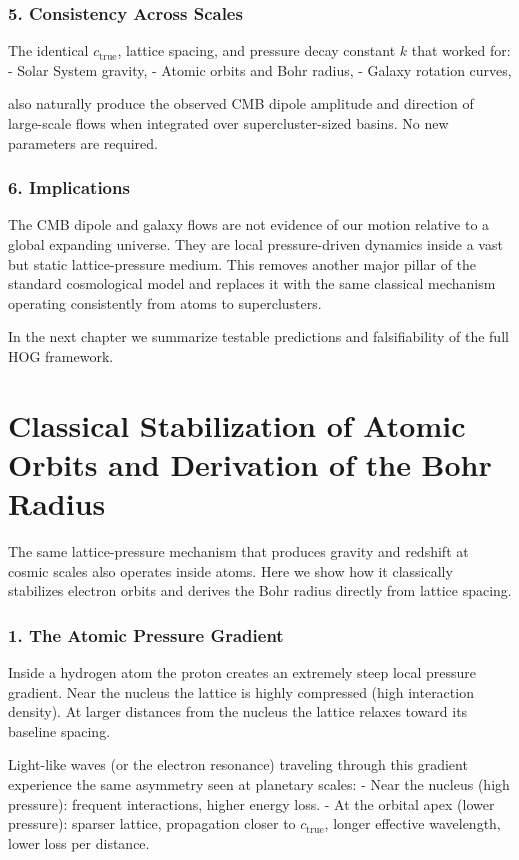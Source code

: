 \documentclass[11pt,a4paper]{book}
\begin{document}
\subsection{5. Consistency Across Scales}
The identical \( c_{\text{true}} \), lattice spacing, and pressure decay constant \( k \) that worked for:
- Solar System gravity,
- Atomic orbits and Bohr radius,
- Galaxy rotation curves,

also naturally produce the observed CMB dipole amplitude and direction of large-scale flows when integrated over supercluster-sized basins. No new parameters are required.

\subsection{6. Implications}
The CMB dipole and galaxy flows are not evidence of our motion relative to a global expanding universe. They are local pressure-driven dynamics inside a vast but static lattice-pressure medium. This removes another major pillar of the standard cosmological model and replaces it with the same classical mechanism operating consistently from atoms to superclusters.

In the next chapter we summarize testable predictions and falsifiability of the full HOG framework.

\chapter{Classical Stabilization of Atomic Orbits and Derivation of the Bohr Radius}

The same lattice-pressure mechanism that produces gravity and redshift at cosmic scales also operates inside atoms. Here we show how it classically stabilizes electron orbits and derives the Bohr radius directly from lattice spacing.

\subsection{1. The Atomic Pressure Gradient}
Inside a hydrogen atom the proton creates an extremely steep local pressure gradient. Near the nucleus the lattice is highly compressed (high interaction density). At larger distances from the nucleus the lattice relaxes toward its baseline spacing.

Light-like waves (or the electron resonance) traveling through this gradient experience the same asymmetry seen at planetary scales:
- Near the nucleus (high pressure): frequent interactions, higher energy loss.
- At the orbital apex (lower pressure): sparser lattice, propagation closer to \( c_{\text{true}} \), longer effective wavelength, lower loss per distance.
\end{document}
